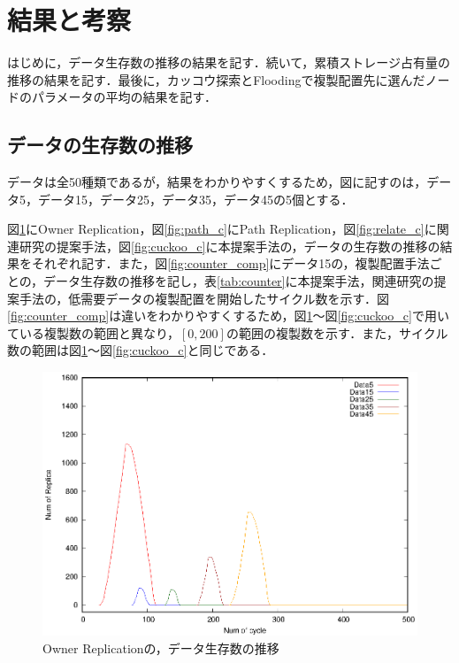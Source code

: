 \documentclass[11pt]{jreport}
\begin{document}
\section{結果と考察}
はじめに，データ生存数の推移の結果を記す．続いて，累積ストレージ占有量の推移の結果を記す．最後に，カッコウ探索とFloodingで複製配置先に選んだノードのパラメータの平均の結果を記す．

\subsection{データの生存数の推移}
データは全50種類であるが，結果をわかりやすくするため，図に記すのは，データ5，データ15，データ25，データ35，データ45の5個とする．
\par 図\ref{fig:owner_c}にOwner Replication，図\ref{fig:path_c}にPath Replication，図\ref{fig:relate_c}に関連研究の提案手法，図\ref{fig:cuckoo_c}に本提案手法の，データの生存数の推移の結果をそれぞれ記す．また，図\ref{fig:counter_comp}にデータ15の，複製配置手法ごとの，データ生存数の推移を記し，表\ref{tab:counter}に本提案手法，関連研究の提案手法の，低需要データの複製配置を開始したサイクル数を示す．図\ref{fig:counter_comp}は違いをわかりやすくするため，図\ref{fig:owner_c}〜図\ref{fig:cuckoo_c}で用いている複製数の範囲と異なり，$[0, 200]$の範囲の複製数を示す．また，サイクル数の範囲は図\ref{fig:owner_c}〜図\ref{fig:cuckoo_c}と同じである．

\begin{figure}[H]
	\begin{center}
		\includegraphics[width=15.0cm]{./figure/owner_counter.eps}
	\end{center}
	\caption{Owner Replicationの，データ生存数の推移}
	\label{fig:owner_c}
\end{figure}
\end{document}
